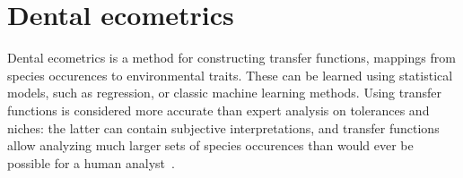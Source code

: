 \documentclass[english,twoside,openright]{UH_DS_MSc}
\begin{document}
\section{Dental ecometrics}
\label{sect:ecometrics}

Dental ecometrics is a method for constructing transfer functions, mappings from species occurences to environmental traits.
These can be learned using statistical models, such as regression, or classic machine learning methods.
Using transfer functions is considered more accurate than expert analysis on tolerances and niches: the latter
can contain subjective interpretations, and transfer functions allow analyzing much larger sets of species occurences than would 
ever be possible for a human analyst~\cite{Faith_Lyman_2019}.
\end{document}
